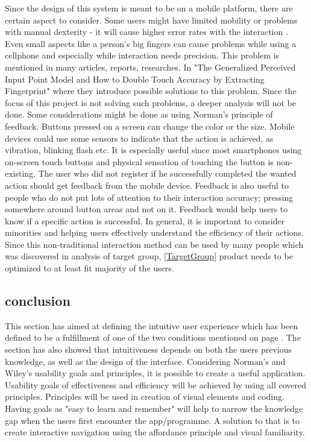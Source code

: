 Since the design of this system is meant to be on a mobile platform, there are certain aspect to consider. Some users might have limited mobility or problems with manual dexterity - it will cause higher error rates with the interaction \cite{Wileys}. Even small aspects like a person's big fingers can cause problems while using a cellphone and especially while interaction needs precision. This problem is mentioned in many articles, reports, researches. In "The Generalized Perceived Input Point Model and How to Double Touch Accuracy by Extracting Fingerprint" \cite{Fatfinger} where they introduce possible solutions to this problem. Since the focus of this project is not solving such problems, a deeper analysis will not be done. Some considerations might be done as using Norman's principle of feedback.\cite{Normans} Buttons pressed on a screen can change the color or the size. Mobile devices could use some sensors to indicate that the action is achieved, as vibration, blinking flash etc. It is especially useful since most smartphones using on-screen touch buttons and physical sensation of touching the button is non-existing.  The user who did not register if he successfully completed the wanted action should get feedback from the mobile device. Feedback is also useful to people who do not put lots of attention to their interaction accuracy; pressing somewhere around button areas and not on it. Feedback would help users to know if a specific action is successful. 
In general, it is important to consider minorities and helping users effectively understand the efficiency of their actions. Since this non-traditional interaction method can be used by many people which was discovered in analysis of target group, \ref{TargetGroup} product needs to be optimized to at least fit majority of the users. 

\subsection{conclusion}
This section has aimed at defining the intuitive user experience which has been defined to be a fulfillment of one of the two conditions mentioned on page \pageref{intuitiveConditions}. The section has also showed that intuitiveness depends on both the users previous knowledge, as well as the design of the interface. Considering Norman's and Wiley's usability goals and principles, it is 
possible to create a useful application. Usability goals of effectiveness and 
efficiency will be achieved by using all covered principles. Principles will be 
used in creation of visual elements and coding. Having goals as "easy to learn and 
remember" will help to narrow the knowledge gap when the users first encounter the app/programme. A solution to that is to create interactive navigation using the
affordance principle and visual familiarity.\label{EvalConUsability}
